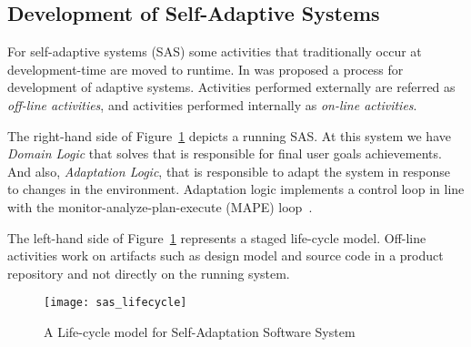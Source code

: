 \subsection{Development of Self-Adaptive Systems}

For self-adaptive systems (SAS) some activities that traditionally occur at development-time are moved to runtime.  In\cite{andersson_software_2013}
was proposed a process for development of adaptive systems.
Activities performed externally are referred as \emph{off-line activities}, and activities performed internally as \emph{on-line activities}.

The right-hand side of Figure~\ref{fig:sas_lifecycle} depicts a running SAS. At this system we have \emph{Domain Logic} that solves that is responsible for final user goals achievements. And also, \emph{Adaptation Logic}, that is responsible to adapt the system in response to changes in the environment. Adaptation logic implements a control loop in line with the monitor-analyze-plan-execute (MAPE) loop~\cite{kephart_vision_2003}.

The left-hand side of Figure~\ref{fig:sas_lifecycle} represents a staged life-cycle model. Off-line activities work on artifacts such as design model and source code in a product repository and not directly on the running system.


\begin{figure}[!htb]
  \centering
  \texttt{[image: sas\_lifecycle]}
  \caption{A Life-cycle model for Self-Adaptation Software System\cite{andersson_software_2013}}
  \label{fig:sas_lifecycle}
\end{figure}
